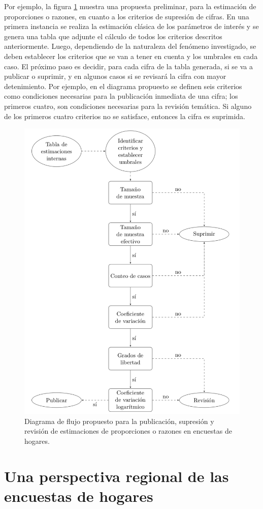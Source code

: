 \documentclass[
  12pt,
  spanish,
]{book}
\begin{document}
Por ejemplo, la figura \ref{fig:figCSj1} muestra una propuesta preliminar, para la estimación de proporciones o razones, en cuanto a los criterios de supresión de cifras. En una primera instancia se realiza la estimación clásica de los parámetros de interés y se genera una tabla que adjunte el cálculo de todos los criterios descritos anteriormente. Luego, dependiendo de la naturaleza del fenómeno investigado, se deben establecer los criterios que se van a tener en cuenta y los umbrales en cada caso. El próximo paso es decidir, para cada cifra de la tabla generada, si se va a publicar o suprimir, y en algunos casos si se revisará la cifra con mayor detenimiento. Por ejemplo, en el diagrama propuesto se definen seis criterios como condiciones necesarias para la publicación inmediata de una cifra; los primeros cuatro, son condiciones necesarias para la revisión temática. Si alguno de los primeros cuatro criterios no se satisface, entonces la cifra es suprimida.

\begin{figure}
\includegraphics[width=0.5\linewidth]{Pics/CSj1} \caption{Diagrama de flujo propuesto para la publicación, supresión y revisión de estimaciones de proporciones o razones en encuestas de hogares.}\label{fig:figCSj1}
\end{figure}

\hypertarget{appendix-appendix}{%
\appendix}


\hypertarget{una-perspectiva-regional-de-las-encuestas-de-hogares}{%
\chapter{Una perspectiva regional de las encuestas de hogares}\label{una-perspectiva-regional-de-las-encuestas-de-hogares}}
\end{document}

